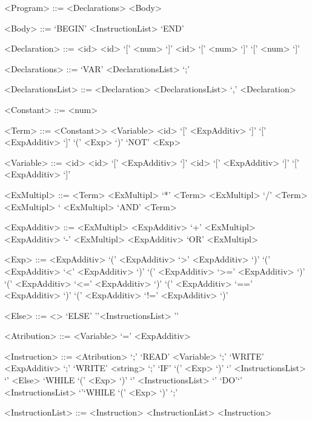 \documentclass{article}
\begin{document}
\begin{grammar}

<Program> ::= <Declarations> <Body> 

<Body> ::= `BEGIN' <InstructionList> `END'

<Declaration> ::= <id>
\alt <id> `[' <num> `]'
\alt <id> `[' <num> `]' `[' <num> `]' 

<Declarations> ::= `VAR' <DeclarationsList> `;' 

<DeclarationsList> ::= <Declaration> 
\alt <DeclarationsList> `,' <Declaration> 

<Constant> ::= <num>


<Term> ::= <Constant>>
\alt <Variable>
\alt <id> `[' <ExpAdditiv> `]' `[' <ExpAdditiv> `]'
\alt `(' <Exp> `)'
\alt `NOT' <Exp>

<Variable> ::= <id>
\alt <id> `[' <ExpAdditiv> `]'
\alt <id> `[' <ExpAdditiv> `]' `[' <ExpAdditiv> `]' 
 
<ExMultipl> ::= <Term>
\alt <ExMultipl> `*'  <Term>
\alt <ExMultipl> `/' <Term>
\alt <ExMultipl> `%
\alt <ExMultipl> `AND' <Term>

<ExpAdditiv> ::= <ExMultipl> 
\alt <ExpAdditiv> `+' <ExMultipl>
\alt <ExpAdditiv> `-' <ExMultipl> 
\alt <ExpAdditiv> `OR' <ExMultipl> 


<Exp> ::= <ExpAdditiv>             
\alt `(' <ExpAdditiv> `>'  <ExpAdditiv> `)'
\alt `(' <ExpAdditiv> `<'  <ExpAdditiv> `)'
\alt `(' <ExpAdditiv> `>=' <ExpAdditiv> `)'
\alt `(' <ExpAdditiv> `<=' <ExpAdditiv> `)'
\alt `(' <ExpAdditiv> `==' <ExpAdditiv> `)'
\alt `(' <ExpAdditiv> `!=' <ExpAdditiv> `)'

<Else> ::= <>
\alt `ELSE' '{'<InstructionsList> '}'

<Atribution> ::=  <Variable> `=' <ExpAdditiv> 

<Instruction> ::= <Atribution> `;' 
\alt `READ'  <Variable> `;'
\alt `WRITE' <ExpAdditiv> `;'                      
\alt `WRITE' <string> `;'
\alt `IF' `(' <Exp> `)' `{' <InstructionsList> `}' <Else>
\alt `WHILE `(' <Exp> `)' `{' <InstructionsList> `}' 
\alt `DO'`{' <InstructionsList> `}'`WHILE `(' <Exp> `)' `;' 

<InstructionList> ::= <Instruction>
\alt <InstructionList> <Instruction>  

\end{grammar}
\end{document}

